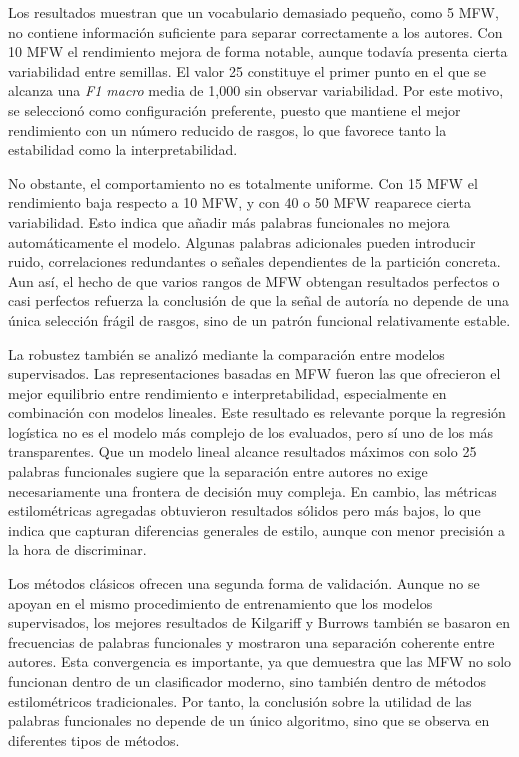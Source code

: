 \documentclass[IB]{TFUOC}%
\begin{document}
Los resultados muestran que un vocabulario demasiado pequeño, como 5 MFW, no contiene información suficiente para separar correctamente a los autores. Con 10 MFW el rendimiento mejora de forma notable, aunque todavía presenta cierta variabilidad entre semillas. El valor 25 constituye el primer punto en el que se alcanza una \textit{F1 macro} media de 1,000 sin observar variabilidad. Por este motivo, se seleccionó como configuración preferente, puesto que mantiene el mejor rendimiento con un número reducido de rasgos, lo que favorece tanto la estabilidad como la interpretabilidad.

No obstante, el comportamiento no es totalmente uniforme. Con 15 MFW el rendimiento baja respecto a 10 MFW, y con 40 o 50 MFW reaparece cierta variabilidad. Esto indica que añadir más palabras funcionales no mejora automáticamente el modelo. Algunas palabras adicionales pueden introducir ruido, correlaciones redundantes o señales dependientes de la partición concreta. Aun así, el hecho de que varios rangos de MFW obtengan resultados perfectos o casi perfectos refuerza la conclusión de que la señal de autoría no depende de una única selección frágil de rasgos, sino de un patrón funcional relativamente estable.

La robustez también se analizó mediante la comparación entre modelos supervisados. Las representaciones basadas en MFW fueron las que ofrecieron el mejor equilibrio entre rendimiento e interpretabilidad, especialmente en combinación con modelos lineales. Este resultado es relevante porque la regresión logística no es el modelo más complejo de los evaluados, pero sí uno de los más transparentes. Que un modelo lineal alcance resultados máximos con solo 25 palabras funcionales sugiere que la separación entre autores no exige necesariamente una frontera de decisión muy compleja. En cambio, las métricas estilométricas agregadas obtuvieron resultados sólidos pero más bajos, lo que indica que capturan diferencias generales de estilo, aunque con menor precisión a la hora de discriminar.

Los métodos clásicos ofrecen una segunda forma de validación. Aunque no se apoyan en el mismo procedimiento de entrenamiento que los modelos supervisados, los mejores resultados de Kilgariff y Burrows también se basaron en frecuencias de palabras funcionales y mostraron una separación coherente entre autores. Esta convergencia es importante, ya que demuestra que las MFW no solo funcionan dentro de un clasificador moderno, sino también dentro de métodos estilométricos tradicionales. Por tanto, la conclusión sobre la utilidad de las palabras funcionales no depende de un único algoritmo, sino que se observa en diferentes tipos de métodos.
\end{document}
